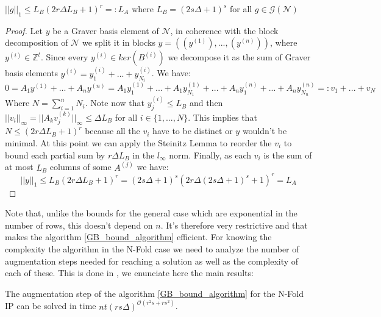 \begin{lemma}
    $||g||_1 \leq L_B (2r\Delta L_B + 1)^r =: L_A$ where $L_B = (2s \Delta + 1)^s$ for all $g \in \mathcal{G}(\mathcal{N})$
\end{lemma}
\vspace{-20pt}
\begin{proof}
Let $y$ be a Graver basis element of $\mathcal{N}$, in coherence with the block decomposition of $\mathcal{N}$ we split it in blocks $y = ((y^{(1)}), ... , (y^{(n)}))$, where $y^{(i)} \in \mathbb{Z}^t$. Since every $y^{(i)} \in ker(B^{(i)})$ we decompose it as the sum of Graver basis elements $y^{(i)} = y^{(i)}_1 +  ... + y^{(i)}_{N_i}$. We have: %
\begin{equation*}
    0 = A_1y^{(1)} + ... + A_ny^{(n)} = A_1y^{(1)}_1 + ... + A_1y^{(1)}_{N_1} + ... + A_ny^{(n)}_1 + ... + A_ny^{(n)}_{N_n} =: v_1 + ... + v_N %
\end{equation*}
Where $N = \sum_{i=1}^n N_i$. Note now that $y^{(i)}_j \leq L_B$  and then $||v_i||_\infty = ||A_kv^{(k)}_j||_\infty \leq \Delta L_B$ for all $i \in \{1, ..., N\}$. This implies that $N \leq (2r\Delta L_B + 1)^r$ because all the $v_i$ have to be distinct or $y$ wouldn't be minimal.  At this point we can apply the Steinitz Lemma to reorder the $v_i$ to bound each partial sum by $r\Delta L_B$ in the $l_\infty$ norm. Finally, as each $v_i$ is the sum of at most $L_B$ columns of some $A^{(j)}$ we have:\\
\begin{equation*}
    ||y||_1 \leq L_B(2r\Delta L_B + 1)^r = (2s\Delta + 1)^s(2r\Delta (2s\Delta + 1)^s + 1)^r = L_A
\end{equation*}

\end{proof}

Note that, unlike the bounds for the general case which are exponential in the number of rows, this doesn't depend on $n$. It's therefore very restrictive and that makes the algorithm \ref{GB_bound_algorithm} efficient. For knowing the complexity the algorithm in the N-Fold case we need to analyze the number of augmentation steps needed for reaching a solution as well as the complexity of each of these. This is done in \cite[Lemmas 4,  5 and 6]{EISENBRAND:2018}, we enunciate here the main results: 

\begin{lemma} \label{NFold_augmentation_step_complexity}
The augmentation step of the algorithm \ref{GB_bound_algorithm} for the N-Fold IP can be solved in time $nt(rs\Delta)^{\mathcal{O}(r^2s+rs^2)}$.
\end{lemma}

